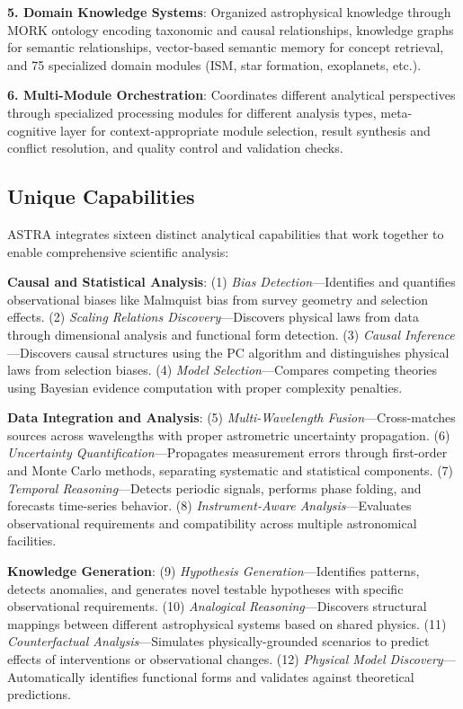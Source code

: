 \documentclass[usenatbib]{rasti}
\begin{document}
\textbf{5. Domain Knowledge Systems}: Organized astrophysical knowledge through MORK ontology encoding taxonomic and causal relationships, knowledge graphs for semantic relationships, vector-based semantic memory for concept retrieval, and 75 specialized domain modules (ISM, star formation, exoplanets, etc.).

\textbf{6. Multi-Module Orchestration}: Coordinates different analytical perspectives through specialized processing modules for different analysis types, meta-cognitive layer for context-appropriate module selection, result synthesis and conflict resolution, and quality control and validation checks.

\subsection{Unique Capabilities}

ASTRA integrates sixteen distinct analytical capabilities that work together to enable comprehensive scientific analysis:

\textbf{Causal and Statistical Analysis}: (1) \textit{Bias Detection}---Identifies and quantifies observational biases like Malmquist bias from survey geometry and selection effects. (2) \textit{Scaling Relations Discovery}---Discovers physical laws from data through dimensional analysis and functional form detection. (3) \textit{Causal Inference}---Discovers causal structures using the PC algorithm and distinguishes physical laws from selection biases. (4) \textit{Model Selection}---Compares competing theories using Bayesian evidence computation with proper complexity penalties.

\textbf{Data Integration and Analysis}: (5) \textit{Multi-Wavelength Fusion}---Cross-matches sources across wavelengths with proper astrometric uncertainty propagation. (6) \textit{Uncertainty Quantification}---Propagates measurement errors through first-order and Monte Carlo methods, separating systematic and statistical components. (7) \textit{Temporal Reasoning}---Detects periodic signals, performs phase folding, and forecasts time-series behavior. (8) \textit{Instrument-Aware Analysis}---Evaluates observational requirements and compatibility across multiple astronomical facilities.

\textbf{Knowledge Generation}: (9) \textit{Hypothesis Generation}---Identifies patterns, detects anomalies, and generates novel testable hypotheses with specific observational requirements. (10) \textit{Analogical Reasoning}---Discovers structural mappings between different astrophysical systems based on shared physics. (11) \textit{Counterfactual Analysis}---Simulates physically-grounded scenarios to predict effects of interventions or observational changes. (12) \textit{Physical Model Discovery}---Automatically identifies functional forms and validates against theoretical predictions.
\end{document}
